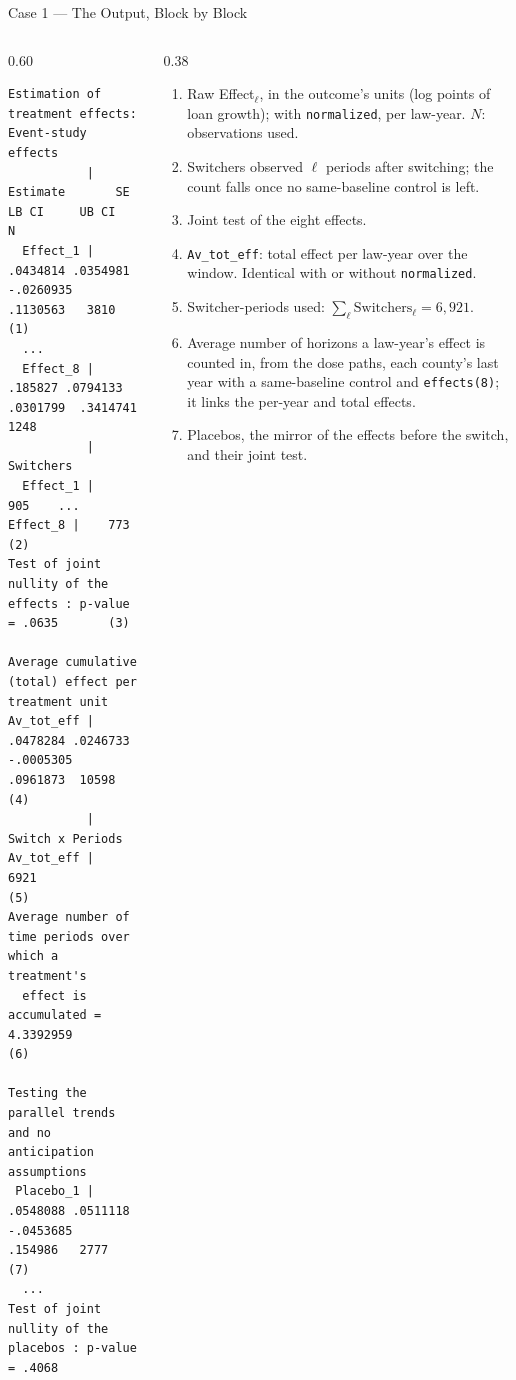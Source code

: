 \documentclass[main.tex]{subfiles}
\begin{document}
\begin{frame}[fragile]{Case 1 --- The Output, Block by Block}

  \begin{columns}[T]
    \begin{column}{0.60\textwidth}
\begin{lstlisting}[basicstyle=\tiny\ttfamily]
Estimation of treatment effects: Event-study effects
           |  Estimate       SE     LB CI     UB CI      N
  Effect_1 |  .0434814 .0354981 -.0260935  .1130563   3810   (1)
  ...
  Effect_8 |   .185827 .0794133  .0301799  .3414741   1248
           | Switchers
  Effect_1 |       905    ...    Effect_8 |    773           (2)
Test of joint nullity of the effects : p-value = .0635       (3)

Average cumulative (total) effect per treatment unit
Av_tot_eff |  .0478284 .0246733 -.0005305  .0961873  10598   (4)
           | Switch x Periods
Av_tot_eff |      6921                                       (5)
Average number of time periods over which a treatment's
  effect is accumulated = 4.3392959                          (6)

Testing the parallel trends and no anticipation assumptions
 Placebo_1 |  .0548088 .0511118 -.0453685   .154986   2777   (7)
  ...
Test of joint nullity of the placebos : p-value = .4068
\end{lstlisting}
    \end{column}
    \begin{column}{0.38\textwidth}
      \scriptsize
      \begin{enumerate}
        \item Raw Effect$_\ell$, in the outcome's units (log points of loan
          growth); with \texttt{normalized}, per law-year. $N$: observations
          used.
        \item Switchers observed $\ell$ periods after switching; the count
          falls once no same-baseline control is left.
        \item Joint test of the eight effects.
        \item \texttt{Av\_tot\_eff}: total effect per law-year over the
          window. Identical with or without \texttt{normalized}.
        \item Switcher-periods used: $\sum_\ell \text{Switchers}_\ell =
          6{,}921$.
        \item Average number of horizons a law-year's effect is counted
          in, from the dose paths, each county's last year with a
          same-baseline control and \texttt{effects(8)}; it links the
          per-year and total effects.
        \item Placebos, the mirror of the effects before the switch, and their
          joint test.
      \end{enumerate}
    \end{column}
  \end{columns}

\end{frame}
\end{document}
